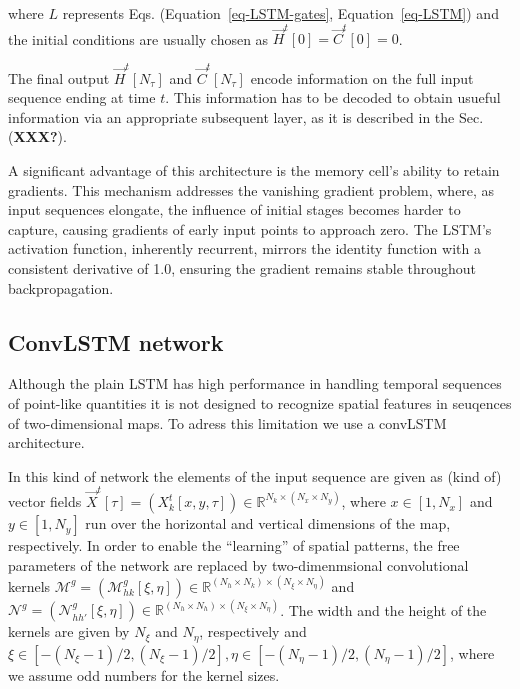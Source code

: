 \documentclass[
]{agujournal2019}
\begin{document}
where \(L\) represents Eqs. (Equation~\ref{eq-LSTM-gates},
Equation~\ref{eq-LSTM}) and the initial conditions are usually chosen as
\(\vec{H}^t[0]=\vec{C}^t[0]=0\).

The final output \(\vec{H}^t[N_\tau]\) and \(\vec{C}^t[N_\tau]\) encode
information on the full input sequence ending at time \(t\). This
information has to be decoded to obtain usueful information via an
appropriate subsequent layer, as it is described in the Sec.
(\textbf{XXX?}).

A significant advantage of this architecture is the memory cell's
ability to retain gradients. This mechanism addresses the vanishing
gradient problem, where, as input sequences elongate, the influence of
initial stages becomes harder to capture, causing gradients of early
input points to approach zero. The LSTM's activation function,
inherently recurrent, mirrors the identity function with a consistent
derivative of 1.0, ensuring the gradient remains stable throughout
backpropagation.

\hypertarget{convlstm-network}{%
\subsection{ConvLSTM network}\label{convlstm-network}}

Although the plain LSTM has high performance in handling temporal
sequences of point-like quantities it is not designed to recognize
spatial features in seuqences of two-dimensional maps. To adress this
limitation we use a convLSTM architecture.

In this kind of network the elements of the input sequence are given as
(kind of) vector fields
\(\vec{X}^t[\tau] = (X^t_k[x,y,\tau]) \in \mathbb{R}^{N_k \times (N_x \times N_y)}\),
where \(x\in[1, N_x]\) and \(y \in [1, N_y]\) run over the horizontal
and vertical dimensions of the map, respectively. In order to enable the
``learning'' of spatial patterns, the free parameters of the network are
replaced by two-dimenmsional convolutional kernels
\(\pmb{\mathcal{M}}^{g} = (\mathcal{M}^{g}_{hk}[\xi, \eta]) \in \mathbb{R}^{(N_h \times N_k)\times (N_\xi \times N_\eta)}\)
and
\(\pmb{\mathcal{N}}^{g} = (\mathcal{N}^{g}_{hh'}[\xi, \eta]) \in \mathbb{R}^{(N_h \times N_h)\times (N_\xi \times N_\eta)}\).
The width and the height of the kernels are given by \(N_\xi\) and
\(N_\eta\), respectively and
\(\xi\in [-(N_\xi-1)/2,(N_\xi-1)/2], \eta\in [-(N_\eta-1)/2,(N_\eta-1)/2]\),
where we assume odd numbers for the kernel sizes.
\end{document}
